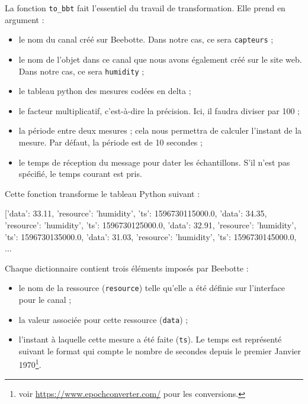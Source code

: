 
La fonction \texttt{to\_bbt} fait l’essentiel du travail de transformation. Elle prend en argument :

\begin{itemize}
    \item le nom du canal créé sur Beebotte. Dans notre cas, ce sera \texttt{capteurs} ;
    \item le nom de l’objet dans ce canal que nous avons également créé sur le site web. Dans notre cas, ce sera \texttt{humidity} ;
    \item le tableau python des mesures codées en delta ;
    \item le facteur multiplicatif, c’est-à-dire la précision. Ici, il faudra diviser par 100 ;
    \item la période entre deux mesures ; cela nous permettra de calculer l’instant de la mesure. Par défaut, la période est de 10 secondes ;
    \item le temps de réception du message pour dater les échantillons. S’il n’est pas spécifié, le temps courant est pris.

\end{itemize}

       \vspace{1em}

Cette fonction transforme le tableau Python suivant :
\begin{termc}[backgroundcolor=\color{palerod},  basicstyle=\ttfamily\small, escapechar=\#]
[3311, 124, -144, -188, -94, 289, -1, -72, 1 ...
\end{termc}

en un tableau de dictionnaire :

\begin{termc}[backgroundcolor=\color{palerod},  basicstyle=\ttfamily\small, escapechar=\#]
[{'data': 33.11, 'resource': 'humidity', 'ts': 1596730115000.0},
 {'data': 34.35, 'resource': 'humidity', 'ts': 1596730125000.0},
 {'data': 32.91, 'resource': 'humidity', 'ts': 1596730135000.0},
 {'data': 31.03, 'resource': 'humidity', 'ts': 1596730145000.0},
 ...
\end{termc}

       \vspace{1em}

Chaque dictionnaire contient trois éléments imposés par Beebotte :

\begin{itemize}
\item le nom de la ressource (\texttt{resource}) telle qu'elle a été définie sur l’interface pour le canal ;
\item la valeur associée pour cette ressource (\texttt{data}) ;
\item l’instant à laquelle cette mesure a été faite (\texttt{ts}). Le temps est représenté suivant le format  qui compte le nombre de secondes depuis le premier Janvier 1970\footnote{voir \url{https://www.epochconverter.com/} pour les conversions.}.
\end{itemize}

